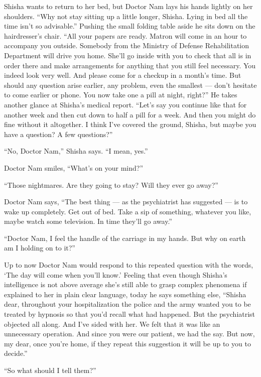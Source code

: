 \documentclass[twoside,11pt,openany]{book}
\begin{document}
Shisha wants to return to her bed, but Doctor Nam lays his hands lightly on    her shoulders. ``Why not
stay sitting up a little longer, Shisha. Lying in bed all the time isn't so advisable.''  Pushing the
small folding table aside he sits down on the hairdresser's chair. ``All your papers are
ready. Matron will come in an hour to accompany you outside. Somebody from the Ministry of Defense
Rehabilitation Department will drive you home. She'll go inside with you to check that all is in order there and make
arrangements for anything that you still feel necessary. You indeed look very well. And please come for a checkup in a
month's time.  But should any question arise earlier, any problem, even the smallest --- don't hesitate to come earlier
or phone. You now take one a pill at night, right?'' He takes another glance at Shisha's medical report.
``Let's say you continue like that for another week and then cut down to half a pill for a week. And then
you might do fine without it altogether. I think I've covered the ground, Shisha, but maybe you have a question? A few
questions?''

``No, Doctor Nam,'' Shisha says. ``I mean, yes.''

Doctor Nam smiles, ``What's on your mind?''

``Those nightmares. Are they going to stay? Will they ever go away?''

Doctor Nam says, ``The best thing --- as the psychiatrist has suggested --- is to wake up completely. Get out
of bed. Take a sip of something,{ }whatever you like, maybe watch some
television. In time they'll go away.''

``Doctor Nam, I feel the handle of the carriage in my hands. But why on earth am I holding on to
it?''

Up to now Doctor Nam would respond to this repeated question with the words, `The day will come when you'll know.'
Feeling that even though Shisha's intelligence is not above average she's still able to grasp complex phenomena if
explained to her in plain clear language, today he says something else, ``Shisha dear, throughout your
hospitalization the police and the army wanted you to be treated by hypnosis so that you'd recall what had happened.
But the psychiatrist objected all along. And I've sided with her. We felt that it was like an unnecessary operation.
And since you were our patient, we had the say. But now, my dear, once you're home, if they repeat this suggestion it
will be up to you to decide.''

``So what should I tell them?''
\end{document}
